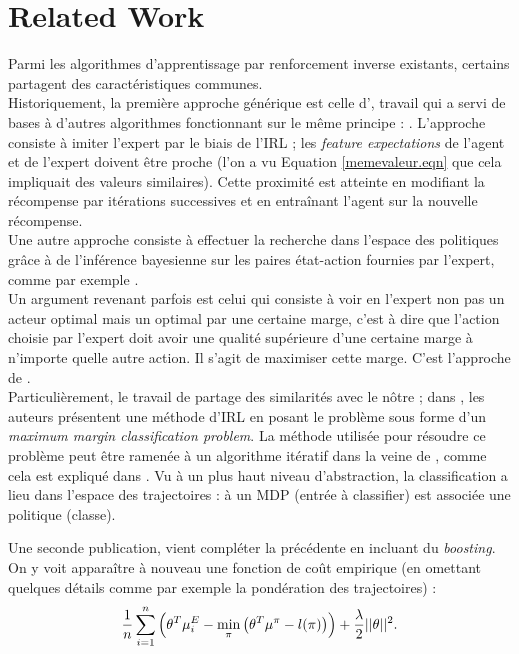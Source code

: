 \documentclass[publibook-draft]{CAp2012}
\begin{document}
{\section{Related Work}
\label{biblio.sec}
Parmi les algorithmes d'apprentissage par renforcement inverse existants, certains partagent des caractéristiques communes.\\

Historiquement, la première approche générique est celle d'\cite{abbeel2004apprenticeship}, travail qui a servi de bases à d'autres algorithmes fonctionnant sur le même principe : \citep{syed2008apprenticeship,syed2008game, ziebart2008maximum}. L'approche consiste à imiter l'expert par le biais de l'IRL ; les {\it feature expectations} de l'agent et de l'expert doivent être proche (l'on a vu Equation \eqref{memevaleur.eqn} que cela impliquait des valeurs similaires). Cette proximité est atteinte en modifiant la récompense par itérations successives et en entraînant l'agent sur la nouvelle récompense.\\

Une autre approche consiste à effectuer la recherche dans l'espace des politiques grâce à de l'inférence bayesienne sur les paires état-action fournies par l'expert, comme par exemple \cite{ramachandran2007bayesian}.\\

Un argument revenant parfois est celui qui consiste à voir en l'expert non pas un acteur optimal mais un optimal par une certaine marge, c'est à dire que l'action choisie par l'expert doit avoir une qualité supérieure d'une certaine marge à n'importe quelle autre action. Il s'agit de maximiser cette marge. C'est l'approche de \citet{ratliff2006maximum,ratliff2007imitation, ratliff2007boosting, kolter2008hierarchical}.\\

Particulièrement, le travail de \citet{ratliff2006maximum} partage des similarités avec le nôtre ; dans \citep{ratliff2006maximum}, les auteurs présentent une méthode d'IRL en posant le problème sous forme d'un \emph{maximum margin classification problem}. La méthode utilisée pour résoudre ce problème peut être ramenée à un algorithme itératif dans la veine de \cite{abbeel2004apprenticeship}, comme cela est expliqué dans \cite{neu2009training}. Vu à un plus haut niveau d'abstraction, la classification a lieu dans l'espace des trajectoires : à un MDP (entrée à classifier) est associée une politique (classe).

   Une seconde publication, \citep{ratliff2007boosting} vient compléter la précédente en incluant du \emph{boosting}. On y voit apparaître à nouveau une fonction de coût empirique (en omettant quelques détails comme par exemple la pondération des trajectoires) : 
   \begin{equation}
   \label{dix.eqn}%
   {1\over n}\sum\limits_{i=1}^n \left(\theta^T\mu^E_i - \min_\pi\left(\theta^T \mu^\pi - l(\pi)\right)\right) + {\lambda \over 2} ||\theta||^2.
   \end{equation}
  
}
\end{document}
